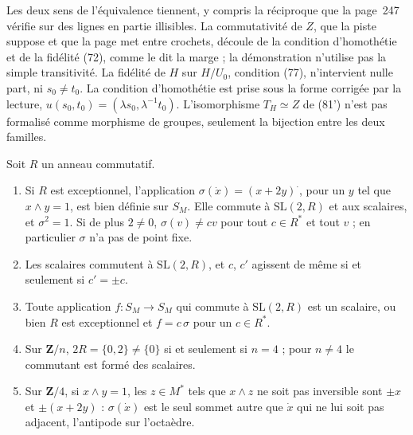 \begin{remarque}
Les deux sens de l'équivalence tiennent, y compris la réciproque que la page~247 vérifie sur des lignes en partie illisibles. La commutativité de $Z$, que la piste suppose et que la page met entre crochets, découle de la condition d'homothétie et de la fidélité (72), comme le dit la marge  ; la démonstration n'utilise pas la simple transitivité. La fidélité de $H$ sur $H/U_0$, condition (77), n'intervient nulle part, ni $s_0 \neq t_0$. La condition d'homothétie est prise sous la forme corrigée par la lecture, $u(s_0, t_0) = (\lambda s_0, \lambda^{-1}t_0)$. L'isomorphisme $T_H \simeq Z$ de (81') n'est pas formalisé comme morphisme de groupes, seulement la bijection entre les deux familles.
\end{remarque}

\begin{encadre}
\begin{theoreme}
Soit $R$ un anneau commutatif.
\begin{enumerate}
\item Si $R$ est exceptionnel, l'application $\sigma(\dot x) = (x + 2y)^{\cdot}$, pour un $y$ tel que $x \wedge y = 1$, est bien définie sur $S_M$. Elle commute à $\mathrm{SL}(2, R)$ et aux scalaires, et $\sigma^2 = 1$. Si de plus $2 \neq 0$, $\sigma(v) \neq cv$ pour tout $c \in R^*$ et tout $v$ ; en particulier $\sigma$ n'a pas de point fixe.
\item Les scalaires commutent à $\mathrm{SL}(2, R)$, et $c$, $c'$ agissent de même si et seulement si $c' = \pm c$.
\item Toute application $f : S_M \to S_M$ qui commute à $\mathrm{SL}(2, R)$ est un scalaire, ou bien $R$ est exceptionnel et $f = c\,\sigma$ pour un $c \in R^*$.
\item Sur $\mathbf Z/n$, $2R = \{0, 2\} \neq \{0\}$ si et seulement si $n = 4$ ; pour $n \neq 4$ le commutant est formé des scalaires.
\item Sur $\mathbf Z/4$, si $x \wedge y = 1$, les $z \in M^*$ tels que $x \wedge z$ ne soit pas inversible sont $\pm x$ et $\pm(x + 2y)$ : $\sigma(\dot x)$ est le seul sommet autre que $\dot x$ qui ne lui soit pas adjacent, l'antipode sur l'octaèdre.
\end{enumerate}
\end{theoreme}
\end{encadre}


